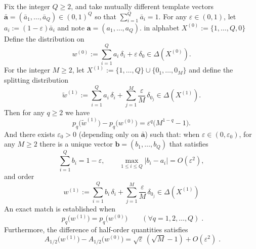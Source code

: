 \begin{theorem}\label{thm:pom-moment-camouflage-finite-orders}
Fix the integer \(Q\ge 2\), and take mutually different template vectors \(\bar{\mathbf a}=(\bar a_1,\dots,\bar a_Q)\in(0,1)^Q\) so that \(\sum_{i=1}^{Q}\bar a_i=1\).
For any \(\varepsilon\in(0,1)\), let \(a_i:=(1-\varepsilon)\bar a_i\) and note \(\mathbf a=(a_1,\dots,a_Q)\).
in alphabet
\(
X^{(0)}:=\{1,\dots,Q,0\}
\)
Define the distribution on
\[
w^{(0)}:=\sum_{i=1}^{Q}a_i\,\delta_i+\varepsilon\,\delta_0\in\Delta(X^{(0)}).
\]
For the integer \(M\ge 2\), let
\(
X^{(1)}:=\{1,\dots,Q\}\cup\{0_1,\dots,0_M\}
\)
and define the splitting distribution
\[
\widetilde w^{(1)}:=\sum_{i=1}^{Q}a_i\,\delta_i+\sum_{j=1}^{M}\frac{\varepsilon}{M}\,\delta_{0_j}\in\Delta(X^{(1)}).
\]
Then for any \(q\ge 2\) we have
\[
p_q\!\bigl(\widetilde w^{(1)}\bigr)-p_q\!\bigl(w^{(0)}\bigr)
=\varepsilon^q\bigl(M^{1-q}-1\bigr).
\]
And there exists \(\varepsilon_0>0\) (depending only on \(\bar{\mathbf a}\)) such that: when \(\varepsilon\in(0,\varepsilon_0)\), for any \(M\ge 2\) there is a unique vector \(\mathbf b=(b_1,\dots,b_Q)\) that satisfies
\[
\sum_{i=1}^{Q}b_i=1-\varepsilon,\qquad
\max_{1\le i\le Q}|b_i-a_i|=O(\varepsilon^2),
\]
and order
\[
w^{(1)}:=\sum_{i=1}^{Q}b_i\,\delta_i+\sum_{j=1}^{M}\frac{\varepsilon}{M}\,\delta_{0_j}\in\Delta(X^{(1)})
\]
An exact match is established when
\[
\boxed{\;
p_q\!\bigl(w^{(1)}\bigr)=p_q\!\bigl(w^{(0)}\bigr)\qquad(\forall q=1,2,\dots,Q)\; }.
\]
Furthermore, the difference of half-order quantities satisfies
\[
\boxed{\;
A_{1/2}\!\bigl(w^{(1)}\bigr)-A_{1/2}\!\bigl(w^{(0)}\bigr)
=\sqrt{\varepsilon}\,(\sqrt{M}-1)+O(\varepsilon^2)\; }.
\]
\end{theorem}
